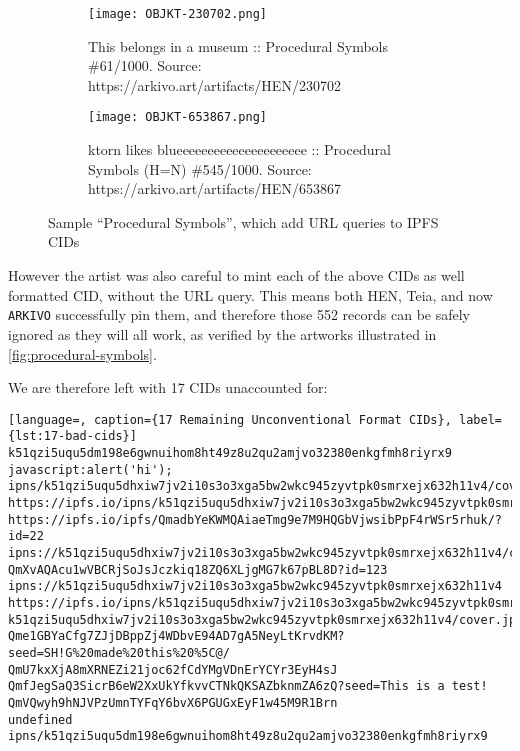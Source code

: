 

\begin{figure}[H]
  \centering
  \begin{subfigure}[b]{0.45\textwidth}
    \centering
    \texttt{[image: OBJKT-230702.png]}
    \caption{This belongs in a museum :: Procedural Symbols \#61/1000. Source: \\https://arkivo.art/artifacts/HEN/230702\\}
    \label{fig:image1}
  \end{subfigure}
  \hfill
  \begin{subfigure}[b]{0.45\textwidth}
    \centering
    \texttt{[image: OBJKT-653867.png]}
    \caption{ktorn likes blueeeeeeeeeeeeeeeeeeeee :: Procedural Symbols (H=N) \#545/1000. Source: \\https://arkivo.art/artifacts/HEN/653867}
    \label{fig:image2}
  \end{subfigure}
  \caption{Sample ``Procedural Symbols'', which add URL queries to IPFS CIDs}
  \label{fig:procedural-symbols}
\end{figure}

However the artist was also careful to mint each of the above CIDs as well formatted CID, without the URL query. This means both HEN, Teia, and now \texttt{ARKIVO} successfully pin them, and therefore those 552 records can be safely ignored as they will all work, as verified by the artworks illustrated in \autoref{fig:procedural-symbols}.

We are therefore left with 17 CIDs unaccounted for:


\begin{lstlisting}[language=, caption={17 Remaining Unconventional Format CIDs}, label={lst:17-bad-cids}] 
k51qzi5uqu5dm198e6gwnuihom8ht49z8u2qu2amjvo32380enkgfmh8riyrx9
javascript:alert('hi');
ipns/k51qzi5uqu5dhxiw7jv2i10s3o3xga5bw2wkc945zyvtpk0smrxejx632h11v4/cover.jpg
https://ipfs.io/ipns/k51qzi5uqu5dhxiw7jv2i10s3o3xga5bw2wkc945zyvtpk0smrxejx632h11v4
https://ipfs.io/ipfs/QmadbYeKWMQAiaeTmg9e7M9HQGbVjwsibPpF4rWSr5rhuk/?id=22
ipns://k51qzi5uqu5dhxiw7jv2i10s3o3xga5bw2wkc945zyvtpk0smrxejx632h11v4/cover.jpg
QmXvAQAcu1wVBCRjSoJsJczkiq18ZQ6XLjgMG7k67pBL8D?id=123
ipns://k51qzi5uqu5dhxiw7jv2i10s3o3xga5bw2wkc945zyvtpk0smrxejx632h11v4
https://ipfs.io/ipns/k51qzi5uqu5dhxiw7jv2i10s3o3xga5bw2wkc945zyvtpk0smrxejx632h11v4/cover.jpg
k51qzi5uqu5dhxiw7jv2i10s3o3xga5bw2wkc945zyvtpk0smrxejx632h11v4/cover.jpg
Qme1GBYaCfg7ZJjDBppZj4WDbvE94AD7gA5NeyLtKrvdKM?seed=SH!G%20made%20this%20%5C@/
QmU7kxXjA8mXRNEZi21joc62fCdYMgVDnErYCYr3EyH4sJ
QmfJegSaQ3SicrB6eW2XxUkYfkvvCTNkQKSAZbknmZA6zQ?seed=This is a test!
QmVQwyh9hNJVPzUmnTYFqY6bvX6PGUGxEyF1w45M9R1Brn
undefined
ipns/k51qzi5uqu5dm198e6gwnuihom8ht49z8u2qu2amjvo32380enkgfmh8riyrx9
\end{lstlisting}


